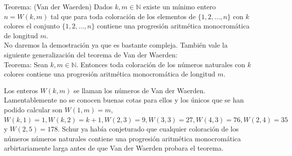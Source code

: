 \documentclass[10pt]{article}
\begin{document}
Teorema: (Van der Waerden) Dados $k, m \in \mathbb{N}$ existe un mínimo entero $n=W(k, m)$ tal que para toda coloración de los elementos de $\{1,2, \ldots, n\}$ con $k$ colores el conjunto $\{1,2, \ldots, n\}$ contiene una progresión aritmética monocromática de longitud $m$.\\
No daremos la demostración ya que es bastante compleja. También vale la siguiente generalización del teorema de Van der Waerden:\\
Teorema: Sean $k, m \in \mathbb{N}$. Entonces toda coloración de los números naturales con $k$ colores contiene una progresión aritmética monocromática de longitud $m$.

Los enteros $W(k, m)$ se llaman los números de Van der Waerden. Lamentablemente no se conocen buenas cotas para ellos y los únicos que se han podido calcular son $W(1, m)=m$, $W(k, 1)=1, W(k, 2)=k+1, W(2,3)=9, W(3,3)=27, W(4,3)=76, W(2,4)=35$ y $W(2,5)=178$. Schur ya había conjeturado que cualquier coloración de los números números naturales contiene una progresión aritmética monocromática arbirtariamente larga antes de que Van der Waerden probara el teorema.
\end{document}
